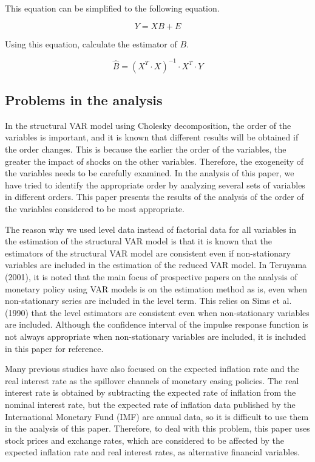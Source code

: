 \documentclass[12pt]{article}
\begin{document}
This equation can be simplified to the following equation.

\begin{equation}
    \label{eq6}
    Y = X B + E
\end{equation}

Using this equation, calculate the estimator of $B$.

\begin{equation}
    \label{eq7}
    \hat{B}=(X^T \cdot X)^{-1} \cdot X^T \cdot Y
\end{equation}

\newpage

\subsection{Problems in the analysis}

In the structural VAR model using Cholesky decomposition, the order of the variables is important, and it is known that different results will be obtained if the order changes.
This is because the earlier the order of the variables, the greater the impact of shocks on the other variables.
Therefore, the exogeneity of the variables needs to be carefully examined.
In the analysis of this paper, we have tried to identify the appropriate order by analyzing several sets of variables in different orders.
This paper presents the results of the analysis of the order of the variables considered to be most appropriate.

The reason why we used level data instead of factorial data for all variables in the estimation of the structural VAR model is that it is known that the estimators of the structural VAR model are consistent even if non-stationary variables are included in the estimation of the reduced VAR model.
In Teruyama (2001), it is noted that the main focus of prospective papers on the analysis of monetary policy using VAR models is on the estimation method as is, even when non-stationary series are included in the level term.
This relies on Sims et al. (1990) that the level estimators are consistent even when non-stationary variables are included.
Although the confidence interval of the impulse response function is not always appropriate when non-stationary variables are included, it is included in this paper for reference.

Many previous studies have also focused on the expected inflation rate and the real interest rate as the spillover channels of monetary easing policies.
The real interest rate is obtained by subtracting the expected rate of inflation from the nominal interest rate, but the expected rate of inflation data published by the International Monetary Fund (IMF) are annual data, so it is difficult to use them in the analysis of this paper.
Therefore, to deal with this problem, this paper uses stock prices and exchange rates, which are considered to be affected by the expected inflation rate and real interest rates, as alternative financial variables.
\end{document}

